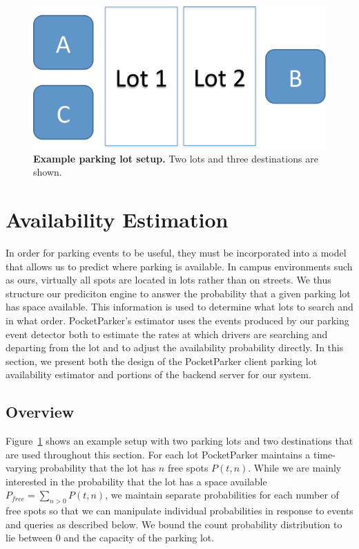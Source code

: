 \begin{figure}
\centering
\includegraphics[height=1.in]{./figures/CartoonLot.pdf}

\caption{\textbf{Example parking lot setup.} Two lots and three
destinations are shown.}

\label{fig-lots}
\end{figure}

\section{Availability Estimation}
\label{sec-model}

In order for parking events to be useful, they must be incorporated into a
model that allows us to predict where parking is available.  In campus
environments such as ours, virtually all spots are located in lots rather than
on streets.  We thus structure our prediciton engine to answer the probability
that a given parking lot has space available.  This information is used to
determine what lots to search and in what order. PocketParker's estimator uses
the events produced by our parking event detector both to estimate the rates
at which drivers are searching and departing from the lot and to adjust the
availability probability directly. In this section, we present both the design
of the PocketParker client parking lot availability estimator and portions of
the backend server for our system.

\subsection{Overview}


Figure~\ref{fig-lots} shows an example setup with two parking lots and two
destinations that are used throughout this section. For each lot PocketParker
maintains a time-varying probability that the lot has $n$ free spots $P(t,
n)$. While we are mainly interested in the probability that the lot has a
space available $P_{free} = \sum_{n > 0} P(t, n)$, we maintain separate
probabilities for each number of free spots so that we can manipulate
individual probabilities in response to events and queries as described
below. We bound the count probability distribution to lie between 0 and the
capacity of the parking lot. 

